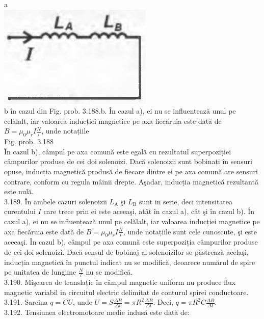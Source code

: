 \documentclass[10pt]{article}
\begin{document}
a\\
\includegraphics[max width=\textwidth, center]{2025_07_01_5b3ff9fa0d508c8e9f17g-377(1)}\\
b în cazul din Fig. prob. 3.188.b. În cazul a), ei nu se influentează unul pe celălalt, iar valoarea inducției magnetice pe axa fiecăruia este dată de $B=\mu_{0} \mu_{r} I \frac{N}{l}$, unde notațiile\\
Fig. prob. 3.188\\
În cazul b), câmpul pe axa comună este egală cu rezultatul superpoziției câmpurilor produse de cei doi solenoizi. Dacă solenoizii sunt bobinați în sensuri opuse, inducția magnetică produsă de fiecare dintre ei pe axa comună are sensuri contrare, conform cu regula mâinii drepte. Aşadar, inducția magnetică rezultantă este nulă.\\
3.189. În ambele cazuri solenoizii $L_{\mathrm{A}}$ şi $L_{\mathrm{B}}$ sunt in serie, deci intensitatea curentului $I$ care trece prin ei este aceeaşi, atât în cazul a), cât şi în cazul b). În cazul a), ei nu se influențează unul pe celălalt, iar valoarea inducției magnetice pe axa fiecăruia este dată de $B=\mu_{0} \mu_{r} I \frac{N}{l}$, unde notațiile sunt cele cunoscute, şi este aceeaşi. În cazul b), câmpul pe axa comună este superpoziția câmpurilor produse de cei doi solenoizi. Dacă sensul de bobinaj al solenoizilor se păstrează acelaşi, inducția magnetică în punctul indicat nu se modifică, deoarece numărul de spire pe unitatea de lungime $\frac{N}{l}$ nu se modifică.\\
3.190. Mişcarea de translație în câmpul magnetic uniform nu produce flux magnetic variabil in circuitul electric delimitat de conturul spirei conductoare.\\
3.191. Sarcina $q=C U$, unde $U=S \frac{\Delta B}{\Delta t}=\pi R^{2} \frac{\Delta B}{\Delta t}$. Deci, $q=\pi R^{2} C \frac{\Delta B}{\Delta t}$.\\
3.192. Tensiunea electromotoare medie indusă este dată de:
\end{document}
